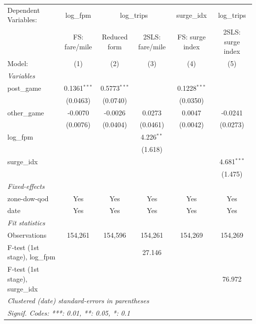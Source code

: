 
\begingroup
\centering
\begin{tabular}{lccccc}
   \tabularnewline \midrule \midrule
   Dependent Variables: & log\_fpm & \multicolumn{2}{c}{log\_trips} & surge\_idx & log\_trips\\
                                   & FS: fare/mile  & Reduced form   & 2SLS: fare/mile & FS: surge index & 2SLS: surge index \\   
   Model:                          & (1)            & (2)            & (3)             & (4)             & (5)\\  
   \midrule
   \emph{Variables}\\
   post\_game                      & 0.1361$^{***}$ & 0.5773$^{***}$ &                 & 0.1228$^{***}$  &   \\   
                                   & (0.0463)       & (0.0740)       &                 & (0.0350)        &   \\   
   other\_game                     & -0.0070        & -0.0026        & 0.0273          & 0.0047          & -0.0241\\   
                                   & (0.0076)       & (0.0404)       & (0.0461)        & (0.0042)        & (0.0273)\\   
   log\_fpm                        &                &                & 4.226$^{**}$    &                 &   \\   
                                   &                &                & (1.618)         &                 &   \\   
   surge\_idx                      &                &                &                 &                 & 4.681$^{***}$\\   
                                   &                &                &                 &                 & (1.475)\\   
   \midrule
   \emph{Fixed-effects}\\
   zone-dow-qod                    & Yes            & Yes            & Yes             & Yes             & Yes\\  
   date                            & Yes            & Yes            & Yes             & Yes             & Yes\\  
   \midrule
   \emph{Fit statistics}\\
   Observations                    & 154,261        & 154,596        & 154,261         & 154,269         & 154,269\\  
   F-test (1st stage), log\_fpm    &                &                & 27.146          &                 & \\  
   F-test (1st stage), surge\_idx  &                &                &                 &                 & 76.972\\  
   \midrule \midrule
   \multicolumn{6}{l}{\emph{Clustered (date) standard-errors in parentheses}}\\
   \multicolumn{6}{l}{\emph{Signif. Codes: ***: 0.01, **: 0.05, *: 0.1}}\\
\end{tabular}
\par\endgroup


